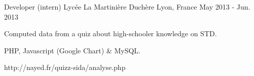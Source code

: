 \begin{cventries}
  \cventry
  {Developer (intern)} %
  {Lycée La Martinière Duchère} %
  {Lyon, France} %
  {May 2013 - Jun. 2013} %
    {
      \begin{cvitems} %
      \item {Computed data from a quiz about high-schooler knowledge on STD.}
      \item {PHP, Javascript (Google Chart) \& MySQL.}
      \item {http://nayed.fr/quizz-sida/analyse.php}
      \end{cvitems}
    }


\end{cventries}
